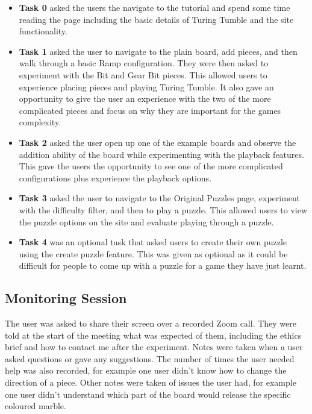 \documentclass{l4proj}
\begin{document}
\begin{itemize}
    \item \textbf{Task 0} asked the users the navigate to the tutorial and spend some time reading the page including the basic details of Turing Tumble and the site functionality.
    \item \textbf{Task 1} asked the user to navigate to the plain board, add pieces, and then walk through a basic Ramp configuration. They were then asked to experiment with the Bit and Gear Bit pieces. This allowed users to experience placing pieces and playing Turing Tumble. It also gave an opportunity to give the user an experience with the two of the more complicated pieces and focus on why they are important for the games complexity.
    \item \textbf{Task 2} asked the user open up one of the example boards and observe the addition ability of the board while experimenting with the playback features. This gave the users the opportunity to see one of the more complicated configurations plus experience the playback options.
    \item \textbf{Task 3} asked the user to navigate to the Original Puzzles page, experiment with the difficulty filter, and then to play a puzzle. This allowed users to view the puzzle options on the site and evaluate playing through a puzzle.
    \item \textbf{Task 4} was an optional task that asked users to create their own puzzle using the create puzzle feature. This was given as optional as it could be difficult for people to come up with a puzzle for a game they have just learnt.
\end{itemize}

\subsection{Monitoring Session}
The user was asked to share their screen over a recorded Zoom call. They were told at the start of the meeting what was expected of them, including the ethics brief and how to contact me after the experiment. Notes were taken when a user asked questions or gave any suggestions. The number of times the user needed help was also recorded, for example one user didn't know how to change the direction of a piece. Other notes were taken of issues the user had, for example one user didn't understand which part of the board would release the specific coloured marble.
\end{document}
